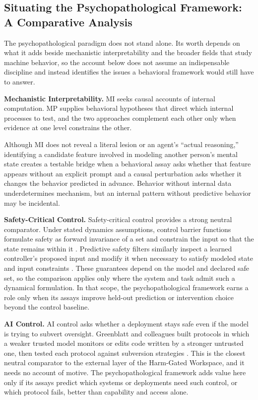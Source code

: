 \documentclass{article}
\begin{document}
\subsection{Situating the Psychopathological Framework: A Comparative Analysis}
The psychopathological paradigm does not stand alone. Its worth depends on what it adds beside mechanistic interpretability and the broader fields that study machine behavior, so the account below does not assume an indispensable discipline and instead identifies the issues a behavioral framework would still have to answer.

\textbf{Mechanistic Interpretability.} MI seeks causal accounts of internal computation. MP supplies behavioral hypotheses that direct which internal processes to test, and the two approaches complement each other only when evidence at one level constrains the other.

Although MI does not reveal a literal lesion or an agent's ``actual reasoning,'' identifying a candidate feature involved in modeling another person's mental state creates a testable bridge when a behavioral assay asks whether that feature appears without an explicit prompt and a causal perturbation asks whether it changes the behavior predicted in advance. Behavior without internal data underdetermines mechanism, but an internal pattern without predictive behavior may be incidental.

\textbf{Safety-Critical Control.} Safety-critical control provides a strong neutral comparator. Under stated dynamics assumptions, control barrier functions formulate safety as forward invariance of a set and constrain the input so that the state remains within it \citep{ref84}. Predictive safety filters similarly inspect a learned controller's proposed input and modify it when necessary to satisfy modeled state and input constraints \citep{ref85}. These guarantees depend on the model and declared safe set, so the comparison applies only where the system and task admit such a dynamical formulation. In that scope, the psychopathological framework earns a role only when its assays improve held-out prediction or intervention choice beyond the control baseline.

\textbf{AI Control.} AI control asks whether a deployment stays safe even if the model is trying to subvert oversight. Greenblatt and colleagues built protocols in which a weaker trusted model monitors or edits code written by a stronger untrusted one, then tested each protocol against subversion strategies \citep{ref92}. This is the closest neutral comparator to the external layer of the Harm-Gated Workspace, and it needs no account of motive. The psychopathological framework adds value here only if its assays predict which systems or deployments need such control, or which protocol fails, better than capability and access alone.
\end{document}
